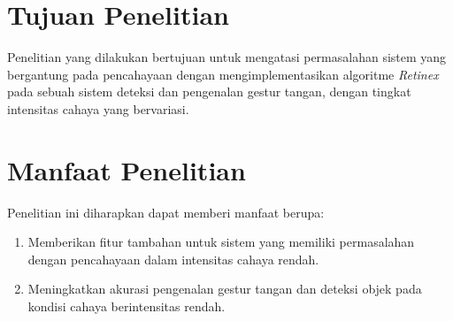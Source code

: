 \section{Tujuan Penelitian}
Penelitian yang dilakukan bertujuan untuk mengatasi permasalahan sistem yang bergantung pada pencahayaan dengan mengimplementasikan algoritme \emph{Retinex} pada sebuah sistem deteksi dan pengenalan gestur tangan, dengan tingkat intensitas cahaya yang bervariasi.
\section{Manfaat Penelitian}
Penelitian ini diharapkan dapat memberi manfaat berupa:
\begin{enumerate}
\item Memberikan fitur tambahan untuk sistem yang memiliki permasalahan dengan pencahayaan dalam intensitas cahaya rendah.
\item Meningkatkan akurasi pengenalan gestur tangan dan deteksi objek pada kondisi cahaya berintensitas rendah.
\end{enumerate}


